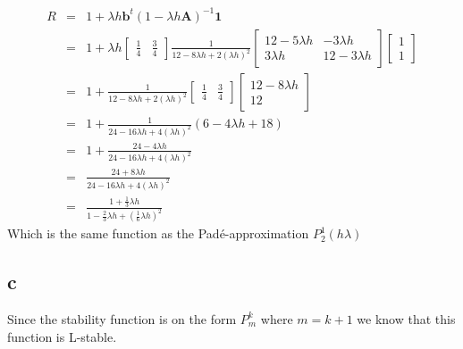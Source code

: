 \documentclass[11pt]{article}
\begin{document}
\begin{eqnarray*}
R &=& 1 + \lambda h \mathbf{b}^t (1 - \lambda h \mathbf{A})^{-1} \mathbf{1} \\
&=& 1 + \lambda h \begin{bmatrix}
\frac{1}{4} & \frac{3}{4} 
\end{bmatrix}
\frac{1}{12 - 8 \lambda h + 2 (\lambda h)^2} 
\begin{bmatrix}
12 - 5 \lambda h & - 3 \lambda h \\
3 \lambda h & 12 - 3 \lambda h
\end{bmatrix}
\begin{bmatrix} 1 \\ 1 \end{bmatrix} \\
&=& 1 + \frac{1}{12 - 8 \lambda h + 2 (\lambda h)^2}
\begin{bmatrix}
\frac{1}{4} & \frac{3}{4} 
\end{bmatrix}
\begin{bmatrix}
12 - 8 \lambda h \\ 12
\end{bmatrix} \\
&=& 1 + \frac{1}{24 - 16 \lambda h + 4 (\lambda h)^2}(6 - 4 \lambda h + 18) \\
&=& 1 + \frac{24 - 4 \lambda h}{24 - 16 \lambda h + 4 (\lambda h)^2} \\
&=& \frac{24 + 8 \lambda h}{24 - 16 \lambda h + 4 (\lambda h)^2} \\
&=& \frac{1 + \frac{1}{3} \lambda h}{1 - \frac{2}{3} \lambda h + (\frac{1}{6} \lambda h)^2}
\end{eqnarray*}
Which is the same function as the Padé-approximation $P^1_2(h \lambda)$

\subsection*{c}
Since the stability function is on the form $P^k_m$ where $m = k + 1$ we know that this function is L-stable.

              
\end{document}
